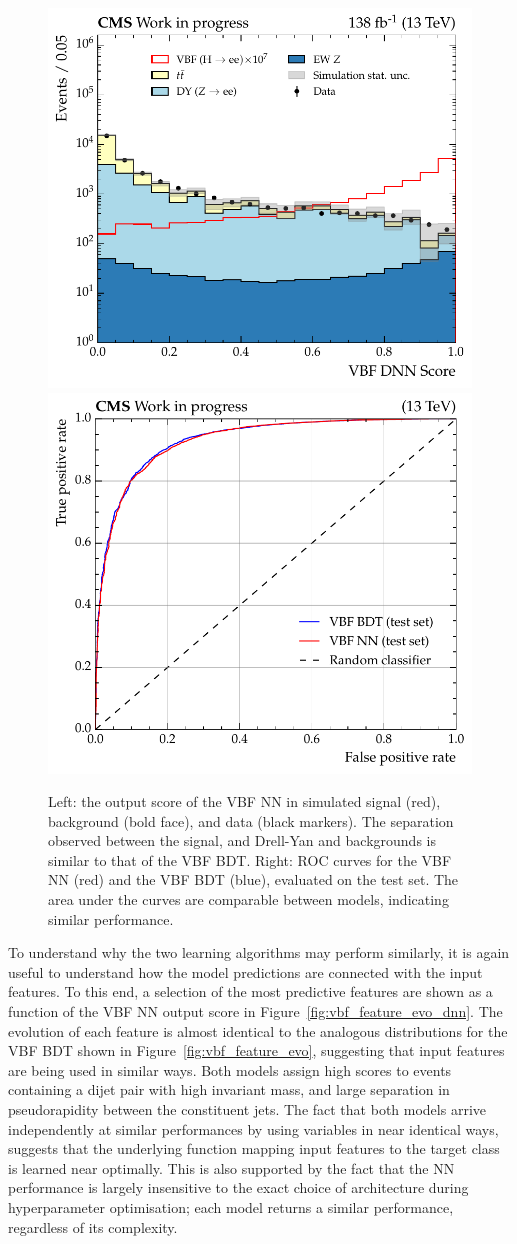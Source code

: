 \begin{figure}[htbp!]
\centering
\includegraphics[width =0.5\linewidth]{Figures/Hee/VBF/DeepLearning/performanceComparison/VBF_DNN_output_score.pdf}\hfill%
\includegraphics[width =0.5\linewidth]{Figures/Hee/VBF/DeepLearning/performanceComparison/VBF_BDT_vs_DNN_ROC.pdf}\hfill%
\caption[The output score of the VBF LSTM neural network.]{Left: the output score of the VBF NN in simulated signal (red), background (bold face), and data (black markers). The separation observed between the signal, and Drell-Yan and \ttbar backgrounds is similar to that of the VBF BDT. Right: ROC curves for the VBF NN (red) and the VBF BDT (blue), evaluated on the test set. The area under the curves are comparable between models, indicating similar performance.}
\label{fig:vbf_nn_vs_bdt}
\end{figure}

To understand why the two learning algorithms may perform similarly, it is again useful to understand how the model predictions are connected with the input features. To this end, a selection of the most predictive features are shown as a function of the VBF NN output score in Figure~\ref{fig:vbf_feature_evo_dnn}. The evolution of each feature is almost identical to the analogous distributions for the VBF BDT shown in Figure~\ref{fig:vbf_feature_evo}, suggesting that input features are being used in similar ways. Both models assign high scores to events containing a dijet pair with high invariant mass, and large separation in pseudorapidity between the constituent jets. The fact that both models arrive independently at similar performances by using variables in near identical ways, suggests that the underlying function mapping input features to the target class is learned near optimally. This is also supported by the fact that the NN performance is largely insensitive to the exact choice of architecture during hyperparameter optimisation; each model returns a similar performance, regardless of its complexity.


